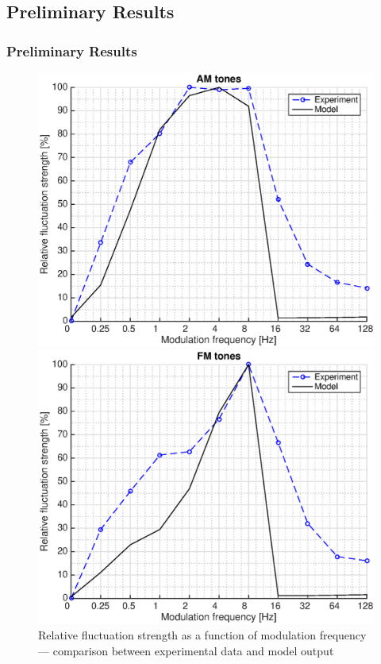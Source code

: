 \documentclass{beamer}
\begin{document}
\subsection{Preliminary Results}
\begin{frame}
  \frametitle{Preliminary Results}
  \begin{figure}
    \centering
    \begin{minipage}{0.45\textwidth}
      \includegraphics[width=\textwidth]{model_am}
    \end{minipage}
    \hfill
    \begin{minipage}{0.45\textwidth}
      \includegraphics[width=\textwidth]{model_fm}
    \end{minipage}
    \caption{Relative fluctuation strength as a function of modulation
      frequency --- comparison between experimental data and model output}
  \end{figure}
\end{frame}
\end{document}
